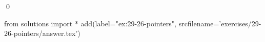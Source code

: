 
\begin{ex}
  \label{ex:29-26-pointers}
  
  \qed
\end{ex}
\begin{python0}
from solutions import *
add(label="ex:29-26-pointers",
    srcfilename='exercises/29-26-pointers/answer.tex')
\end{python0}

